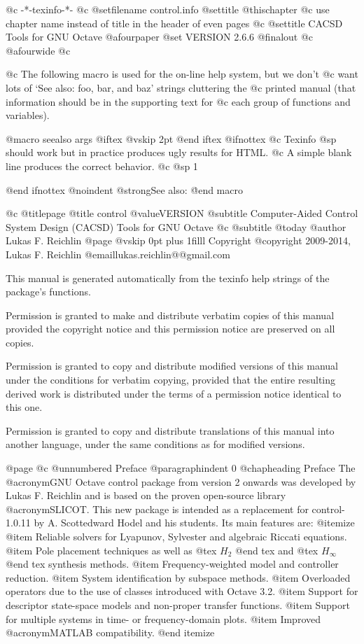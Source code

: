    @c -*-texinfo-*-
@c %
@setfilename control.info
@settitle @thischapter
@c use chapter name instead of title in the header of even pages
@c @settitle CACSD Tools for GNU Octave
@afourpaper
@set VERSION 2.6.6
@finalout
@c @afourwide
@c %


@c The following macro is used for the on-line help system, but we don't
@c want lots of `See also: foo, bar, and baz' strings cluttering the
@c printed manual (that information should be in the supporting text for
@c each group of functions and variables).

@macro seealso {args}
@iftex
@vskip 2pt
@end iftex
@ifnottex
@c Texinfo @sp should work but in practice produces ugly results for HTML.
@c A simple blank line produces the correct behavior. 
@c @sp 1

@end ifnottex
@noindent
@strong{See also:} \args\.
@end macro


@c %
@titlepage
@title control @value{VERSION}
@subtitle Computer-Aided Control System Design (CACSD) Tools for GNU Octave
@c @subtitle @today{}
@author Lukas F. Reichlin
@page
@vskip 0pt plus 1filll
Copyright @copyright{} 2009-2014, Lukas F. Reichlin @email{lukas.reichlin@@gmail.com}

This manual is generated automatically from the texinfo help strings
of the package's functions.

Permission is granted to make and distribute verbatim copies of
this manual provided the copyright notice and this permission notice
are preserved on all copies.

Permission is granted to copy and distribute modified versions of this
manual under the conditions for verbatim copying, provided that the entire
resulting derived work is distributed under the terms of a permission
notice identical to this one.

Permission is granted to copy and distribute translations of this manual
into another language, under the same conditions as for modified versions.


@page
@c @unnumbered Preface
@paragraphindent 0
@chapheading Preface
The @acronym{GNU} Octave control package from version 2 onwards was
developed by Lukas F. Reichlin and is based on the proven open-source
library @acronym{SLICOT}. This new package is intended as a replacement
for control-1.0.11 by A. Scottedward Hodel and his students.
Its main features are:
@itemize
@item Reliable solvers for Lyapunov, Sylvester and algebraic Riccati equations.
@item Pole placement techniques as well as @tex $ H_2 $ @end tex
and @tex $ H_{\infty} $ @end tex
synthesis methods.
@item Frequency-weighted model and controller reduction.
@item System identification by subspace methods.
@item Overloaded operators due to the use of classes introduced with Octave 3.2.
@item Support for descriptor state-space models and non-proper transfer functions.
@item Support for multiple systems in time- or frequency-domain plots.
@item Improved @acronym{MATLAB} compatibility.
@end itemize

